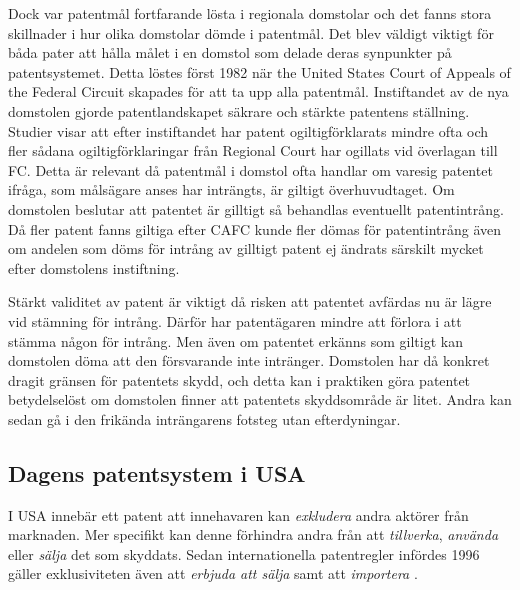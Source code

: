Dock var patentmål fortfarande lösta i regionala domstolar och det fanns stora skillnader i hur olika
domstolar dömde i patentmål\cite{nard}. Det blev väldigt viktigt för båda pater att hålla målet i en
domstol som delade deras synpunkter på patentsystemet. Detta löstes först 1982 när the United States
Court of Appeals of the Federal Circuit skapades för att ta upp alla patentmål\cite{nard}. Instiftandet
av de nya domstolen gjorde patentlandskapet säkrare och stärkte patentens ställning. Studier visar att
efter instiftandet har patent ogiltigförklarats mindre ofta och fler sådana ogiltigförklaringar från
Regional Court har ogillats vid överlagan till FC. \cite{henry} Detta är relevant då patentmål i domstol
ofta handlar om varesig patentet ifråga, som målsägare anses har inträngts, är giltigt överhuvudtaget.
Om domstolen beslutar att patentet är gilltigt så behandlas eventuellt patentintrång. Då fler patent
fanns giltiga efter CAFC kunde fler dömas för patentintrång även om andelen som döms för intrång av
gilltigt patent ej ändrats särskilt mycket efter domstolens instiftning. 


Stärkt validitet av patent är viktigt då risken att patentet avfärdas nu är lägre vid stämning för
intrång. Därför har patentägaren mindre att förlora i att stämma någon för intrång. Men
även om patentet erkänns som giltigt kan domstolen döma att den försvarande inte intränger.
Domstolen har då konkret dragit gränsen för patentets skydd, och detta kan i praktiken göra patentet
betydelselöst om domstolen finner att patentets skyddsområde är litet. Andra kan sedan gå i den frikända
inträngarens fotsteg utan efterdyningar\cite{henry}.




\subsection{Dagens patentsystem i USA}

I USA innebär ett patent att innehavaren kan \emph{exkludera} andra aktörer från marknaden. Mer specifikt kan denne förhindra andra från att \emph{tillverka}, \emph{använda} eller \emph{sälja} det som skyddats. Sedan internationella patentregler infördes 1996 gäller exklusiviteten även att \emph{erbjuda att sälja} samt att \emph{importera} \cite{cmu-overview}.


